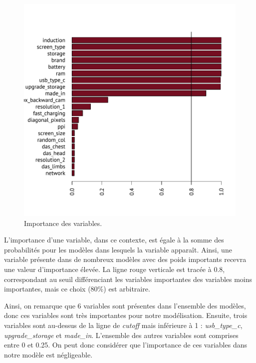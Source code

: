 \documentclass[
  12pt,
]{report}
\begin{document}
\newpage

\begin{figure}[H]

{\centering \includegraphics{report_files/figure-pdf/var_importance-1.pdf}

}

\caption{Importance des variables.}

\end{figure}%

L'importance d'une variable, dans ce contexte, est égale à la somme des
probabilités pour les modèles dans lesquels la variable apparaît. Ainsi,
une variable présente dans de nombreux modèles avec des poids importants
recevra une valeur d'importance élevée. La ligne rouge verticale est
tracée à 0.8, correspondant au seuil différenciant les variables
importantes des variables moins importantes, mais ce choix (80\%) est
arbitraire.

Ainsi, on remarque que 6 variables sont présentes dans l'ensemble des
modèles, donc ces variables sont très importantes pour notre
modélisation. Ensuite, trois variables sont au-dessus de la ligne de
\emph{cutoff} mais inférieure à 1 : \emph{usb\_type\_c},
\emph{upgrade\_storage} et \emph{made\_in}. L'ensemble des autres
variables sont comprises entre 0 et 0.25. On peut donc considérer que
l'importance de ces variables dans notre modèle est négligeable.
\end{document}
